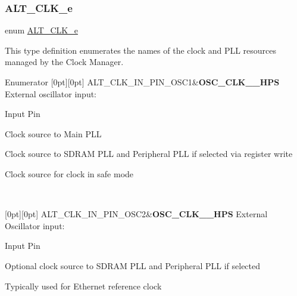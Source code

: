 \subsubsection{\texorpdfstring{ALT\_CLK\_e}{ALT\_CLK\_e}}
{\footnotesize\ttfamily enum \mbox{\hyperlink{group__CLK__MGR_ga931510957187a22cb4e6adef8d9d105a}{A\+L\+T\+\_\+\+C\+L\+K\+\_\+e}}}

This type definition enumerates the names of the clock and P\+LL resources managed by the Clock Manager. \begin{DoxyEnumFields}{Enumerator}
[0pt][0pt]{}\mbox{\label{group__CLK__MGR_gga931510957187a22cb4e6adef8d9d105aaa2f619b461c4eb42162ee91aaa330c3f}} 
A\+L\+T\+\_\+\+C\+L\+K\+\_\+\+I\+N\+\_\+\+P\+I\+N\+\_\+\+O\+S\+C1&{\bfseries{O\+S\+C\+\_\+\+C\+L\+K\+\_\+\_\+\+H\+PS}} External oscillator input\+:
\begin{DoxyItemize}
\item Input Pin
\item Clock source to Main P\+LL
\item Clock source to S\+D\+R\+AM P\+LL and Peripheral P\+LL if selected via register write
\item Clock source for clock in safe mode 
\end{DoxyItemize}\\
\hline

[0pt][0pt]{}\mbox{\label{group__CLK__MGR_gga931510957187a22cb4e6adef8d9d105aae7c24ec877ed3e161d459b85d474dd34}} 
A\+L\+T\+\_\+\+C\+L\+K\+\_\+\+I\+N\+\_\+\+P\+I\+N\+\_\+\+O\+S\+C2&{\bfseries{O\+S\+C\+\_\+\+C\+L\+K\+\_\+\_\+\+H\+PS}} External Oscillator input\+:
\begin{DoxyItemize}
\item Input Pin
\item Optional clock source to S\+D\+R\+AM P\+LL and Peripheral P\+LL if selected
\item Typically used for Ethernet reference clock 
\end{DoxyItemize}\\
\hline


\end{DoxyEnumFields}
